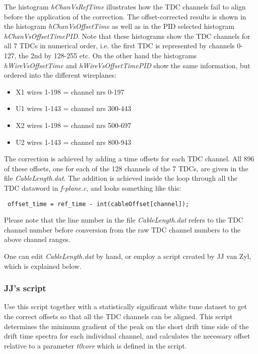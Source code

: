 \documentclass[11pt]{report}
\begin{document}
The histogram {\it hChanVsRefTime} illustrates how the TDC channels fail to align before
the application of the correction.
The offset-corrected results is shown in the histogram {\it hChanVsOffsetTime}
as well as in the PID selected histogram {\it hChanVsOffsetTimePID}.
Note that these histograms show the TDC channels for all 7 TDCs in numerical order,
i.e. the first TDC is represented by channels 0-127, the 2nd by 128-255 etc.
On the other hand the histograms {\it hWireVsOffsetTime} and {\it hWireVsOffsetTimePID} 
show the same information, but ordered into the different wireplanes:
\begin{itemize}
\item X1 wires 1-198 = channel nrs 0-197
\item U1 wires 1-143 = channel nrs 300-443
\item X2 wires 1-198 = channel nrs 500-697
\item U2 wires 1-143 = channel nrs 800-943
\end{itemize}

The correction is achieved by adding a time offsets for each TDC channel.
All 896 of these offsets, one for each of the 128 channels of the 7 TDCs, are given in the
file {\it CableLength.dat}. The addition is achieved inside the
loop through all the TDC dataword in {\it f-plane.c}, and looks something like this:
\begin{verbatim} offset_time = ref_time - int(cableOffset[channel]);  \end{verbatim}
Please note that the line number in the file {\it CableLength.dat} refers to the TDC channel
number before conversion from the raw TDC channel numbers to the above channel ranges.

One can edit {\it CableLength.dat} by hand, or employ a script created by JJ van Zyl, which 
is explained below.

\subsubsection{JJ's script}

Use this script together with a statistically significant 
white tune dataset to get the correct offsets so that all the TDC channels can be aligned. 
This script determines the minimum gradient
of the peak on the short drift time side of the drift time spectra for each
individual channel, and calculates the
necessary offset relative to a parameter {\it t0corr} which is defined in the script.
\end{document}
